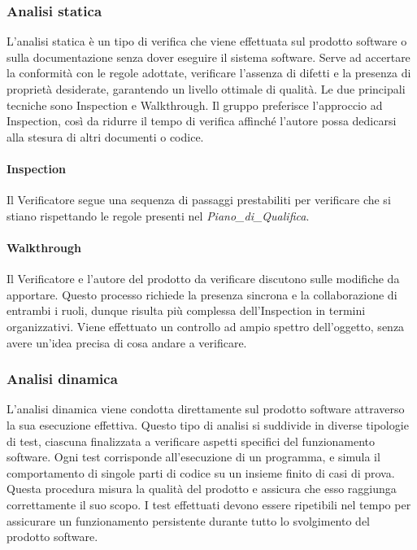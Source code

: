 \documentclass[10pt]{article}
\begin{document}
\begin{justify}
    \subsubsection{Analisi statica}
    L'analisi statica è un tipo di verifica che viene effettuata sul prodotto software o sulla documentazione senza dover eseguire il sistema software. Serve ad accertare la conformità con le regole adottate, verificare l'assenza di difetti e la presenza di proprietà desiderate, garantendo un livello ottimale di qualità. Le due principali tecniche sono Inspection e Walkthrough. Il gruppo preferisce l'approccio ad Inspection, così da ridurre il tempo di verifica affinché l'autore possa dedicarsi alla stesura di altri documenti o codice.
    
    \paragraph{Inspection}
    Il Verificatore segue una sequenza di passaggi prestabiliti per verificare che si stiano rispettando le regole presenti nel \textit{Piano\_di\_Qualifica}.
    
    \paragraph{Walkthrough}
    Il Verificatore e l'autore del prodotto da verificare discutono sulle modifiche da apportare. Questo processo richiede la presenza sincrona e la collaborazione di entrambi i ruoli, dunque risulta più complessa dell'Inspection in termini organizzativi. Viene effettuato un controllo ad ampio spettro dell'oggetto, senza avere un'idea precisa di cosa andare a verificare.

    \subsubsection{Analisi dinamica}
    L'analisi dinamica viene condotta direttamente sul prodotto software attraverso la sua esecuzione effettiva. Questo tipo di analisi si suddivide in diverse tipologie di test, ciascuna finalizzata a verificare aspetti specifici del funzionamento software. Ogni test corrisponde all'esecuzione di un programma, e simula il comportamento di singole parti di codice su un insieme finito di casi di prova.\\
    Questa procedura misura la qualità del prodotto e assicura che esso raggiunga correttamente il suo scopo. I test effettuati devono essere ripetibili nel tempo per assicurare un funzionamento persistente durante tutto lo svolgimento del prodotto software.
    

\end{justify}
\end{document}

